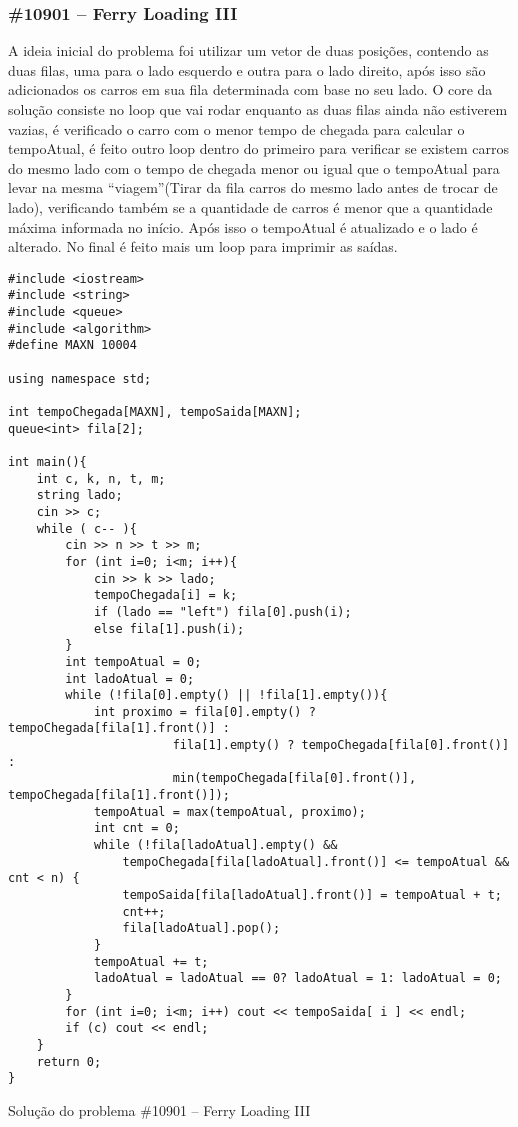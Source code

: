 \documentclass[a4paper,12pt]{scrartcl}
\begin{document}
\subsubsection{\#10901 – Ferry Loading III}
A ideia inicial do problema foi utilizar um vetor de duas posições, contendo as duas filas, uma para o lado esquerdo e outra para o lado direito, após isso são adicionados os carros em sua fila determinada com base no seu lado. O core da solução consiste no loop que vai rodar enquanto as duas filas ainda não estiverem vazias, é verificado o carro com o menor tempo de chegada para calcular o tempoAtual, é feito outro loop dentro do primeiro para verificar se existem carros do mesmo lado com o tempo de chegada menor ou igual que o tempoAtual para levar na mesma “viagem”(Tirar da fila carros do mesmo lado antes de trocar de lado), verificando também se a quantidade de carros é menor que a quantidade máxima informada no início. Após isso o tempoAtual é atualizado e o lado é alterado. No final é feito mais um loop para imprimir as saídas.

\begin{listing}[H]
\begin{verbatim}
#include <iostream>
#include <string>
#include <queue>
#include <algorithm>
#define MAXN 10004

using namespace std;

int tempoChegada[MAXN], tempoSaida[MAXN];
queue<int> fila[2];

int main(){
    int c, k, n, t, m;
    string lado;
    cin >> c;
    while ( c-- ){
        cin >> n >> t >> m;
        for (int i=0; i<m; i++){
            cin >> k >> lado;
            tempoChegada[i] = k;
            if (lado == "left") fila[0].push(i);
            else fila[1].push(i);
        }
        int tempoAtual = 0;
        int ladoAtual = 0;
        while (!fila[0].empty() || !fila[1].empty()){
            int proximo = fila[0].empty() ? tempoChegada[fila[1].front()] :
                       fila[1].empty() ? tempoChegada[fila[0].front()] :
                       min(tempoChegada[fila[0].front()], tempoChegada[fila[1].front()]);
            tempoAtual = max(tempoAtual, proximo);
            int cnt = 0;
            while (!fila[ladoAtual].empty() &&
                tempoChegada[fila[ladoAtual].front()] <= tempoAtual && cnt < n) {
                tempoSaida[fila[ladoAtual].front()] = tempoAtual + t;
                cnt++;
                fila[ladoAtual].pop();
            }
            tempoAtual += t;
            ladoAtual = ladoAtual == 0? ladoAtual = 1: ladoAtual = 0;
        }
        for (int i=0; i<m; i++) cout << tempoSaida[ i ] << endl;
        if (c) cout << endl;
    }   
    return 0;
}
\end{verbatim}
\caption{\footnotesize{Solução do problema \#10901 – Ferry Loading III}}
\end{listing}
\end{document}
